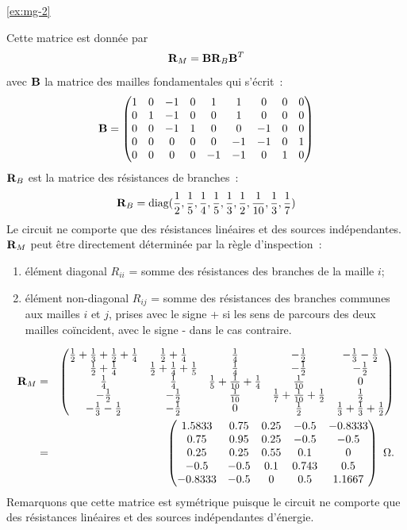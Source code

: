 \begin{solexercise}{\ref{ex:mg-2}}

Cette matrice est donnée par
\[{\bf R}_M={\bf B}{\bf R}_B{\bf B}^T\]
avec ${\bf B}$ la matrice des mailles fondamentales qui s'écrit~:
\[{\bf B}=
\begin{pmatrix}
1 & 0 & -1 & 0 & 1 & 1 & 0 & 0 & 0\\
0 & 1 & -1 & 0 & 0 & 1 & 0 & 0 & 0\\
0 & 0 & -1 & 1 & 0 & 0 & -1 & 0 & 0 \\
0 & 0 & 0 & 0 & 0  & -1 & -1 & 0 & 1 \\
0 & 0 & 0 & 0 & -1 & -1 & 0 & 1 & 0
\end{pmatrix}\]
${\bf R}_B$ est la matrice des résistances de branches~:
\[ {\bf R}_B=\mbox{diag}(\dfrac{1}{2},\dfrac{1}{5},\dfrac{1}{4},
\dfrac{1}{5},\dfrac{1}{3},\dfrac{1}{2},\dfrac{1}{10},
\dfrac{1}{3},\dfrac{1}{7})\]
Le circuit ne comporte que des résistances linéaires et des sources
indépendantes. ${\bf R}_M$ peut  être directement déterminée par la règle
d'inspection~:
\begin{enumerate}
	\item élément diagonal $R_{ii}$ = somme des résistances
	des branches de la maille $i$;
	\item élément non-diagonal $R_{ij}$ = somme des résistances des branches communes aux
	mailles $i$ et $j$, prises avec le signe + si les sens de parcours des
	deux mailles coïncident, avec le signe - dans le cas contraire.
\end{enumerate}
\begin{eqnarray*}
	{\bf R}_M & = &
	\begin{pmatrix}
		\frac{1}{2}+\frac{1}{3}+\frac{1}{2}+\frac{1}{4} & 
		\frac{1}{2}+\frac{1}{4} & \frac{1}{4} & -\frac{1}{2} & -\frac{1}{3}-\frac{1}{2}\\
		\frac{1}{2}+\frac{1}{4}& \frac{1}{2}+\frac{1}{4}+\frac{1}{5} & 
		\frac{1}{4} & -\frac{1}{2} & -\frac{1}{2}\\
		\frac{1}{4} & \frac{1}{4}& \frac{1}{5}+\frac{1}{10}+\frac{1}{4} & 
		\frac{1}{10} & 0 \\
		-\frac{1}{2}& -\frac{1}{2}& \frac{1}{10}& 
		\frac{1}{7}+\frac{1}{10}+\frac{1}{2} & \frac{1}{2}\\
		-\frac{1}{3}-\frac{1}{2} & -\frac{1}{2} & 0 & \frac{1}{2}  & 
		\frac{1}{3}+\frac{1}{3}+\frac{1}{2}
	\end{pmatrix}\\
	& = & 
	\begin{pmatrix}
		1.5833 & 0.75 & 0.25 & -0.5 & -0.8333\\
		0.75 & 0.95 & 0.25 & -0.5 & -0.5 \\
		0.25 & 0.25 & 0.55 & 0.1 & 0  \\
		-0.5 & -0.5 & 0.1 & 0.743 & 0.5 \\
		-0.8333 & -0.5 & 0 & 0.5 & 1.1667
	\end{pmatrix}\,\, \Omega\text{.}
\end{eqnarray*}
Remarquons que cette matrice est symétrique puisque le circuit ne
comporte que des résistances linéaires et des sources indépendantes
d'énergie.


\end{solexercise}

